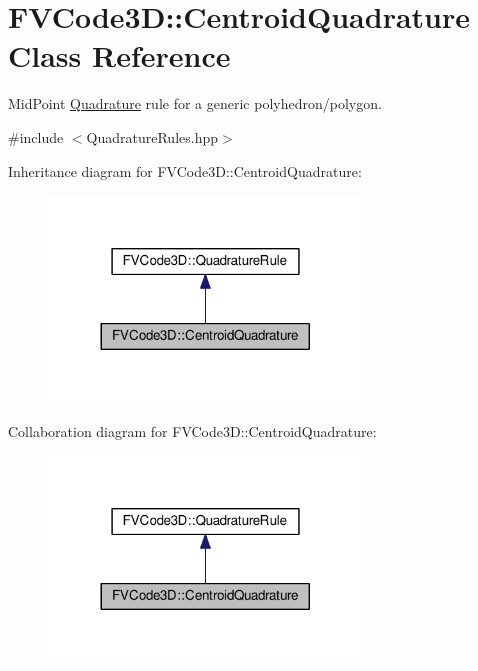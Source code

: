 \hypertarget{classFVCode3D_1_1CentroidQuadrature}{}\section{F\+V\+Code3D\+:\+:Centroid\+Quadrature Class Reference}
\label{classFVCode3D_1_1CentroidQuadrature}


Mid\+Point \hyperlink{classFVCode3D_1_1Quadrature}{Quadrature} rule for a generic polyhedron/polygon.  




{\ttfamily \#include $<$Quadrature\+Rules.\+hpp$>$}



Inheritance diagram for F\+V\+Code3D\+:\+:Centroid\+Quadrature\+:
\nopagebreak
\begin{figure}[H]
\begin{center}
\leavevmode
\includegraphics[width=236pt]{classFVCode3D_1_1CentroidQuadrature__inherit__graph}
\end{center}
\end{figure}


Collaboration diagram for F\+V\+Code3D\+:\+:Centroid\+Quadrature\+:
\nopagebreak
\begin{figure}[H]
\begin{center}
\leavevmode
\includegraphics[width=236pt]{classFVCode3D_1_1CentroidQuadrature__coll__graph}
\end{center}
\end{figure}

